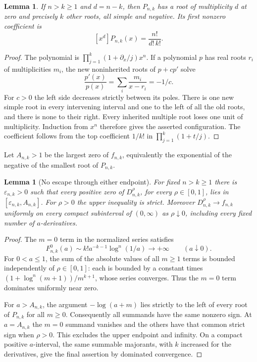 \documentclass[11pt,letterpaper]{article}
\numberwithin{equation}{section}
\theoremstyle{plain}
\newtheorem{lemma}[theorem]{Lemma}
\theoremstyle{definition}
\theoremstyle{remark}
\begin{document}
\begin{lemma}\label{cont26:lem:bif-elementary-roots}
If $n>k\geq1$ and $d=n-k$, then $P_{n,k}$ has a root of multiplicity
$d$ at zero and precisely $k$ other roots, all simple and negative.
Its first nonzero coefficient is
\[
 [x^d]P_{n,k}(x)=\frac{n!}{d!\,k!}.
\]
\end{lemma}
\begin{proof}
The polynomial is $\prod_{j=1}^k(1+\partial_x/j)x^n$. If a polynomial
$p$ has real roots $r_i$ of multiplicities $m_i$, the new noninherited
roots of $p+c p'$ solve
\[
 \frac{p'(x)}{p(x)}=\sum_i\frac{m_i}{x-r_i}=-1/c.
\]
For $c>0$ the left side decreases strictly between its poles. There is
one new simple root in every intervening interval and one to the left
of all the old roots, and there is none to their right. Every inherited
multiple root loses one unit of multiplicity. Induction from $x^n$
therefore gives the asserted configuration. The coefficient follows
from the top coefficient $1/k!$ in $\prod_{j=1}^k(1+t/j)$.
\end{proof}

Let $A_{n,k}>1$ be the largest zero of $f_{n,k}$, equivalently the
exponential of the negative of the smallest root of $P_{n,k}$.

\begin{lemma}[No escape through either endpoint]\label{cont26:lem:bif-no-escape}
For fixed $n>k\geq1$ there is $\varepsilon_{n,k}>0$ such that every
positive zero of $D_{n,k}^{\rho}$, for every $\rho\in[0,1]$, lies in
$[\varepsilon_{n,k},A_{n,k}]$. For $\rho>0$ the upper inequality is strict.
Moreover $D_{n,k}^{\rho}\to f_{n,k}$ uniformly on every compact
subinterval of $(0,\infty)$ as $\rho\downarrow0$, including every fixed
number of $a$-derivatives.
\end{lemma}
\begin{proof}
The $m=0$ term in the normalized series satisfies
\[
 F_{n,k}^{0}(a)\sim k!a^{-k-1}\log^n(1/a)\longrightarrow+\infty
 \qquad(a\downarrow0).
\]
For $0<a\leq1$, the sum of the absolute values of all $m\geq1$ terms is
bounded independently of $\rho\in[0,1]$: each is bounded by a constant
times $(1+\log^n(m+1))/m^{k+1}$, whose series converges.
Thus the $m=0$ term dominates uniformly near zero.

For $a>A_{n,k}$, the argument $-\log(a+m)$ lies strictly to the left
of every root of $P_{n,k}$ for all $m\geq0$. Consequently all summands
have the same nonzero sign. At $a=A_{n,k}$ the $m=0$ summand vanishes
and the others have that common strict sign when $\rho>0$. This excludes
the upper endpoint and infinity. On a compact positive $a$-interval,
the same summable majorants, with $k$ increased for the derivatives,
give the final assertion by dominated convergence.
\end{proof}
\end{document}
